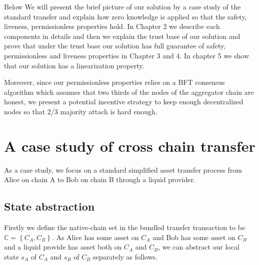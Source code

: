 \documentclass[pageno]{jpaper}
\begin{document}
Below We will present the brief picture of our solution by a case study of the standard transfer and explain how zero knowledge is applied so that the safety, liveness, permissionless properties hold. In Chapter 2 we describe each components in details and then we explain the trust base of our solution and prove that under the trust base our solution has full guarantee of safety, permissionless and liveness properties in Chapter 3 and 4. In chapter 5 we show that our solution has a linearization property. 

Moreover, since our permissionless properties relies on a BFT consensus algorithm which assumes that two thirds of the nodes of the aggregator chain are honest, we present a potential incentive strategy to keep enough decentralized nodes so that 2/3 majority attach is hard enough.


\section{A case study of cross chain transfer}
As a case study, we focus on a standard simplified asset transfer process from Alice on chain A to Bob on chain B through a liquid provider. 
\subsection{State abstraction}
Firstly we define the native-chain set in the bundled transfer transaction to be $\mathbb{C} = \left\{C_A, C_B\right\}$. As Alice has some asset on $C_A$ and Bob has some asset on $C_B$ and a liquid provide has asset both on $C_A$ and $C_B$, we can abstract our local state $s_A$ of $C_A$ and $s_B$ of $C_B$ separately as follows.
\end{document}
